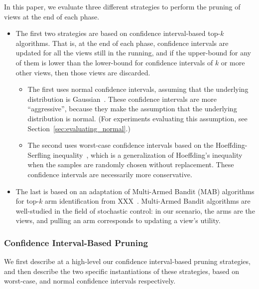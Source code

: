 In this paper, we evaluate three different strategies
to perform the pruning of views at the end of each phase.
\begin{itemize}
\item The first two strategies are based on confidence interval-based top-$k$ algorithms.
That is, at the end of each phase, confidence intervals are updated for all
the views still in the running, and if the upper-bound for any of them
is lower than the lower-bound for confidence intervals of $k$ or more other views,
then those views are discarded.
\begin{itemize}
\item The first uses normal confidence intervals, assuming that 
the underlying distribution is Gaussian~\cite{all-of-statistics}.
These confidence intervals are more ``aggressive'', because they make the assumption
that the underlying distribution is normal.
(For experiments evaluating this assumption, see Section~\ref{sec:evaluating_normal}.)
\item The second uses worst-case confidence intervals based on the
Hoeffding-Serfling inequality~\cite{serfling1974probability}, 
which is a generalization of Hoeffding's inequality~\cite{hoeffding1963probability}
when the samples are randomly chosen without replacement.
These confidence intervals are necessarily more conservative.
\end{itemize}
\item The last is based on an adaptation of Multi-Armed Bandit (MAB) algorithms
for top-$k$ arm identification from XXX~\cite{}. 
Multi-Armed Bandit algorithms are well-studied in the field of stochastic control:
in our scenario, the arms are the views, and pulling an arm corresponds
to updating a view's utility.
\end{itemize}


\subsubsection{Confidence Interval-Based Pruning}
We first describe at a high-level our confidence interval-based pruning strategies,
and then describe the two specific instantiations of these strategies,
based on worst-case, and normal confidence intervals respectively.

